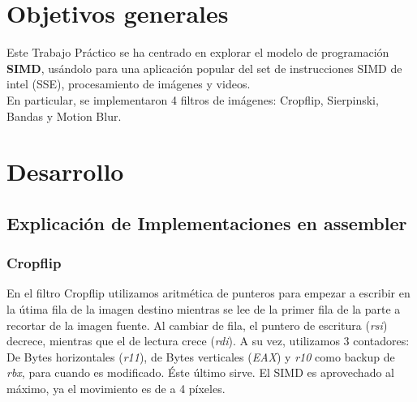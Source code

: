 \documentclass[a4paper]{article}
\begin{document}
\thispagestyle{empty}

\maketitle
\newpage

\thispagestyle{empty}
\vfill
\begin{abstract}



\end{abstract}

\thispagestyle{empty}
\vspace{3cm}
\tableofcontents
\newpage


\newpage

\section{Objetivos generales}

Este Trabajo Pr\'{a}ctico se ha centrado en explorar el modelo de programaci\'{o}n \textbf{SIMD}, us\'{a}ndolo para una aplicaci\'{o}n popular del set de instrucciones SIMD de intel (SSE), procesamiento de im\'{a}genes y videos.\\
En particular, se implementaron 4 filtros de im\'{a}genes: Cropflip, Sierpinski, Bandas y Motion Blur.\\


\section{Desarrollo}

\subsection{Explicaci\'{o}n de Implementaciones en assembler}

\subsubsection{Cropflip}
En el filtro Cropflip utilizamos aritm\'{e}tica de punteros para empezar a escribir en la \'{u}tima fila de la imagen destino mientras se lee de la primer fila de la parte a recortar de la imagen fuente. Al cambiar de fila, el puntero de escritura (\textit{rsi}) decrece, mientras que el de lectura crece (\textit{rdi}). A su vez, utilizamos 3 contadores: De Bytes horizontales (\textit{r11}), de Bytes verticales (\textit{EAX}) y \textit{r10} como backup de \textit{rbx}, para cuando es modificado. \'{E}ste \'{u}ltimo sirve. El SIMD es aprovechado al m\'{a}ximo, ya el movimiento es de a 4 p\'{i}xeles.
\end{document}
